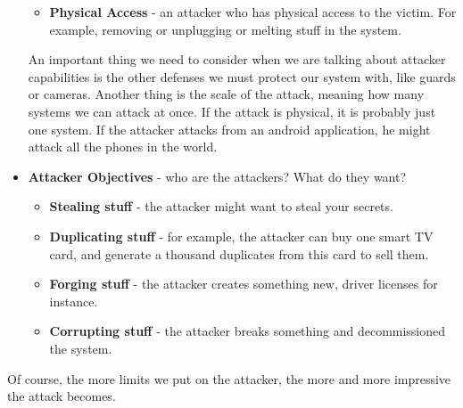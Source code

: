 \begin{itemize}
\begin{itemize}
            \item \textbf{Physical Access} - an attacker who has physical access
            to the victim. For example, removing or unplugging or melting stuff
            in the system.
        \end{itemize}
        An important thing we need to consider when we are talking about
        attacker capabilities is the other defenses we must protect our system with, like
 guards or cameras. Another thing is the scale of the attack, meaning how many systems we can attack at once. If the attack is physical, it is probably just one system. If the attacker attacks from an android application, he might attack all the phones in the world.
    \item \textbf{Attacker Objectives} - who are the attackers? What do they
    want?
        \begin{itemize}
            \item \textbf{Stealing stuff} - the attacker might want to steal
            your secrets.
            \item \textbf{Duplicating stuff} - for example, the attacker can buy
            one smart TV card, and generate a thousand duplicates from this card
            to sell them. 
            \item \textbf{Forging stuff} - the attacker creates something new,
            driver licenses for instance.
            \item \textbf{Corrupting stuff} - the attacker breaks something and
            decommissioned the system.
        \end{itemize}
\end{itemize}

Of course, the more limits we put on the attacker, the more and more
impressive the attack becomes.

